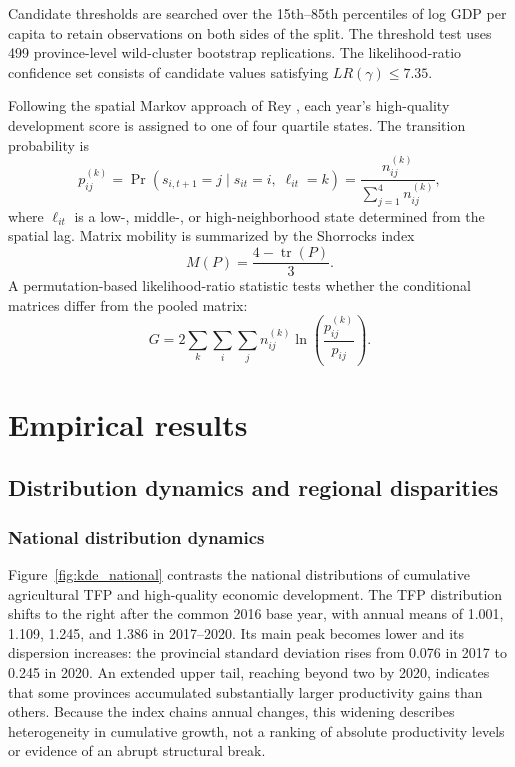 \documentclass[sustainability,article,submit,moreauthors]{Definitions/mdpi}
\numberwithin{equation}{section}
\begin{document}
Candidate thresholds are searched over the 15th--85th percentiles of log GDP
per capita to retain observations on both sides of the split. The threshold
test uses 499 province-level wild-cluster bootstrap replications. The
likelihood-ratio confidence set consists of candidate values satisfying
$LR(\gamma)\leq 7.35$.

Following the spatial Markov approach of Rey \cite{rey2001}, each year's high-quality development score is assigned to one of four quartile states. The transition probability is
\begin{equation}
p_{ij}^{(k)}=\Pr\left(s_{i,t+1}=j\mid s_{it}=i,\;\ell_{it}=k\right)
=\frac{n_{ij}^{(k)}}{\sum_{j=1}^{4}n_{ij}^{(k)}},
\label{eq:markov}
\end{equation}
where $\ell_{it}$ is a low-, middle-, or high-neighborhood state determined from the spatial lag. Matrix mobility is summarized by the Shorrocks index
\begin{equation}
M(P)=\frac{4-\operatorname{tr}(P)}{3}.
\label{eq:shorrocks}
\end{equation}
A permutation-based likelihood-ratio statistic tests whether the conditional matrices differ from the pooled matrix:
\begin{equation}
G=2\sum_k\sum_i\sum_j n_{ij}^{(k)}
\ln\left(\frac{p_{ij}^{(k)}}{p_{ij}}\right).
\label{eq:gtest}
\end{equation}

\section{Empirical results}

\subsection{Distribution dynamics and regional disparities}

\subsubsection{National distribution dynamics}

Figure~\ref{fig:kde_national} contrasts the national distributions of
cumulative agricultural TFP and high-quality economic development.
The TFP distribution shifts to the right after the common 2016 base year,
with annual means of 1.001, 1.109, 1.245, and 1.386 in 2017--2020.
Its main peak becomes lower and its dispersion increases: the provincial
standard deviation rises from 0.076 in 2017 to 0.245 in 2020.
An extended upper tail, reaching beyond two by 2020, indicates that some
provinces accumulated substantially larger productivity gains than others.
Because the index chains annual changes, this widening describes
heterogeneity in cumulative growth, not a ranking of absolute productivity
levels or evidence of an abrupt structural break.
\end{document}
